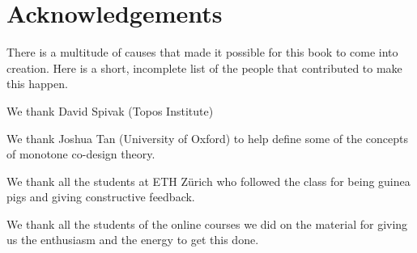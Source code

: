 
\section{Acknowledgements}

There is a multitude of causes that made it possible for this book to come into creation.
Here is a short, incomplete list of the people that contributed to make this happen.

We thank David Spivak  (Topos Institute)

We thank Joshua Tan (University of Oxford) to help define some of the concepts of monotone co-design theory.

We thank all the students at ETH Zürich who followed the class for being guinea pigs and giving constructive feedback. 

We thank all the students of the online courses we did on the material for giving us the enthusiasm and the energy to get this done.
